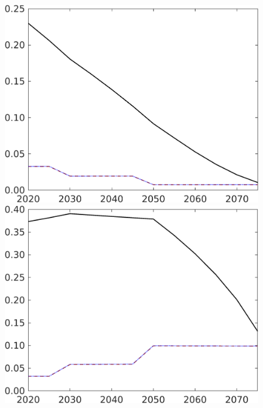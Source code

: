 \begin{figure}[h!!]
\begin{minipage}[]{0.32\textwidth}
	\end{minipage}
	\begin{minipage}[]{0.32\textwidth}
		\includegraphics[width=1\textwidth]{../../codding_model/own_basedOnFried/optimalPol_190722_tidiedUp/figures/all_July22/sff_DDCompEffOPT_T_NoTaus_pol4_spillover0_noskill0_sep1_xgrowth0_etaa0.79_lgd0_lff0.png}
	\end{minipage}
	\begin{minipage}[]{0.32\textwidth}
		\includegraphics[width=1\textwidth]{../../codding_model/own_basedOnFried/optimalPol_190722_tidiedUp/figures/all_July22/sg_DDCompEffOPT_T_NoTaus_pol4_spillover0_noskill0_sep1_xgrowth0_etaa0.79_lgd0_lff0.png}

\end{minipage}
\end{figure}
